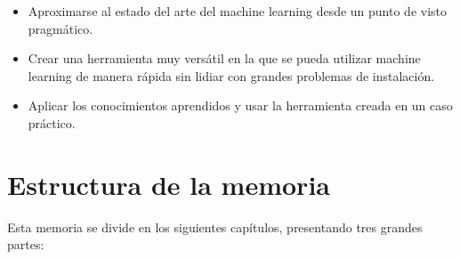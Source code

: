 \begin{itemize}
\item[\textbullet] Aproximarse al estado del arte del machine learning desde un punto de visto pragmático.

\item[\textbullet] Crear una herramienta muy versátil en la que se pueda utilizar machine learning de manera rápida sin lidiar con grandes problemas de instalación.

\item[\textbullet] Aplicar los conocimientos aprendidos y usar la herramienta creada en un caso práctico.
\end{itemize}

\section{Estructura de la memoria} \label{sec:1.4}

Esta memoria se divide en los siguientes capítulos, presentando tres grandes partes:

